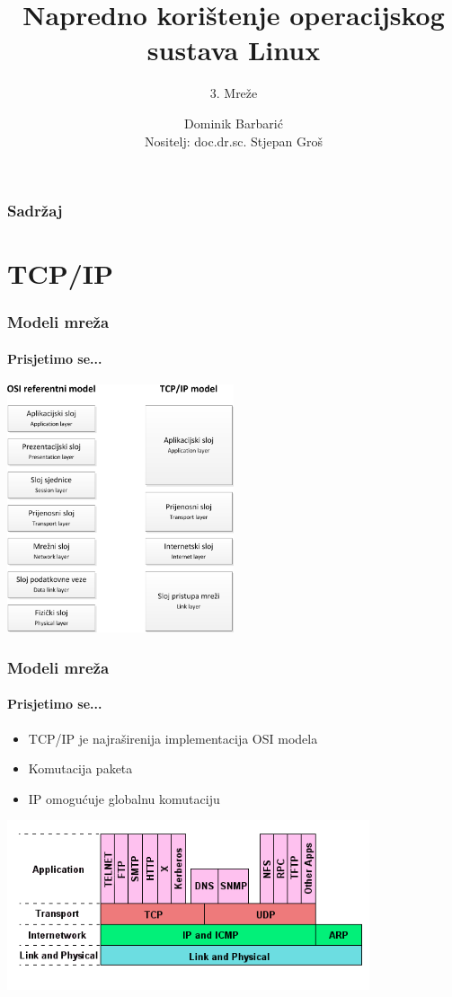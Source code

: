 \documentclass[t,table,usenames,dvipsnames]{beamer}
\date{\todayiso}
\title[NKOSL]{Napredno korištenje operacijskog sustava Linux}
\author[Dominik Barbarić]{Dominik Barbarić\\{\small Nositelj: doc.dr.sc. Stjepan Groš}}
\subtitle{3. Mreže}
\institute[FER]{Sveučilište u Zagrebu\\Fakultet elektrotehnike i računarstva}
\begin{document}
{
	\begin{frame}
		\maketitle
	\end{frame}
}

\begin{frame}
	\frametitle{Sadržaj}
	\tableofcontents
\end{frame}

\section{TCP/IP}

\begin{frame}
	\frametitle{Modeli mreža}
	\framesubtitle{Prisjetimo se...}
	\centering
	\includegraphics[width=0.5\textwidth]{osi_tcpip.png}
\end{frame}

\begin{frame}
	\frametitle{Modeli mreža}
	\framesubtitle{Prisjetimo se...}
	\begin{itemize}
		\item TCP/IP je najraširenija implementacija OSI modela
		\item Komutacija paketa
		\item IP omogućuje globalnu komutaciju
	\end{itemize}
	\vfill
	\includegraphics[width=0.8\textwidth]{service_layer.png}
\end{frame}
\end{document}
